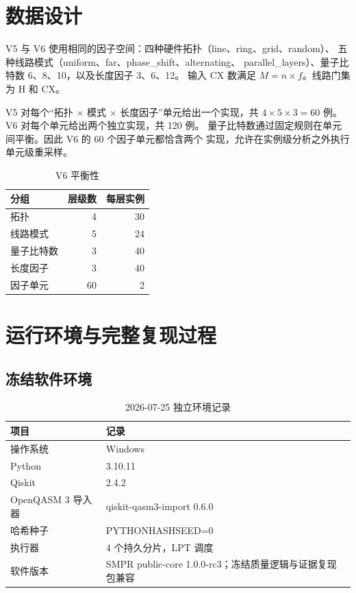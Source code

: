 \documentclass[11pt,a4paper]{article}
\begin{document}
\section{数据设计}

V5 与 V6 使用相同的因子空间：四种硬件拓扑（line、ring、grid、random）、
五种线路模式（uniform、far、phase\_shift、alternating、
parallel\_layers）、量子比特数 6、8、10，以及长度因子 3、6、12。
输入 CX 数满足 $M=n\times f$。线路门集为 H 和 CX。

V5 对每个“拓扑 $\times$ 模式 $\times$ 长度因子”单元给出一个实现，共
$4\times5\times3=60$ 例。V6 对每个单元给出两个独立实现，共 120 例。
量子比特数通过固定规则在单元间平衡。因此 V6 的 60 个因子单元都恰含两个
实现，允许在实例级分析之外执行单元级重采样。

\begin{table}[H]
\centering
\caption{V6 平衡性}
\begin{tabular}{lrr}
\toprule
分组 & 层级数 & 每层实例 \\
\midrule
拓扑 & 4 & 30 \\
线路模式 & 5 & 24 \\
量子比特数 & 3 & 40 \\
长度因子 & 3 & 40 \\
因子单元 & 60 & 2 \\
\bottomrule
\end{tabular}
\end{table}

\section{运行环境与完整复现过程}

\subsection{冻结软件环境}

\begin{table}[H]
\centering
\caption{2026-07-25 独立环境记录}
\begin{tabularx}{\textwidth}{C{4.2cm}Y}
\toprule
项目 & 记录 \\
\midrule
操作系统 & Windows \\
Python & 3.10.11 \\
Qiskit & 2.4.2 \\
OpenQASM 3 导入器 & qiskit-qasm3-import 0.6.0 \\
哈希种子 & PYTHONHASHSEED=0 \\
执行器 & 4 个持久分片，LPT 调度 \\
软件版本 & SMPR public-core 1.0.0-rc3；冻结质量逻辑与证据复现包兼容 \\
\bottomrule
\end{tabularx}
\end{table}
\end{document}
